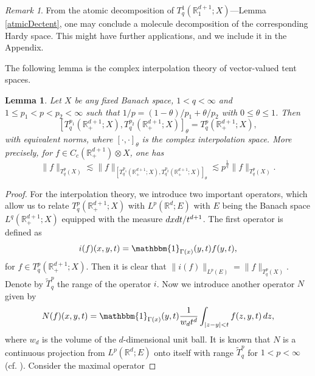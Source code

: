 \documentclass[oneside,english,a4wide]{amsart}
\numberwithin{equation}{section}
\numberwithin{figure}{section}
\theoremstyle{plain}
\theoremstyle{plain}
\theoremstyle{definition}
\theoremstyle{plain}
\newtheorem{lemma}[thm]{Lemma}
\theoremstyle{remark}
\theoremstyle{definition}
\theoremstyle{remark}
\newtheorem{remark}[thm]{Remark}
\theoremstyle{definition}
\newcommand{\real}{{\mathbb R}}
\newcommand{\8}{+\infty}
\renewcommand{\1}{\mathbbm{1}}
\newcommand{\wt}{\widetilde}
\renewcommand\d{{\rm d}}
\begin{document}
{\begin{remark}
From the atomic decomposition of $T^1_q(\mathbb R^{d+1}_1; X)$---Lemma \ref{atmicDectent}, one may conclude a molecule decomposition of the corresponding Hardy space. This might have further applications, and we include it in the Appendix.
\end{remark}

The following lemma is the complex interpolation theory of vector-valued tent spaces.
\begin{lemma}\label{Intpo}
   Let $X$ be any fixed Banach space, $1<q<\infty$ and $1 \leq p_1 < p < p_2 < \infty$ such that $1/p = (1-\theta)/p_1 + \theta/p_2$ with $0\leq\theta\leq1$. Then
   \[
        [T^{p_1}_q(\real^{d+1}_+;X), T^{p_2}_q(\real^{d+1}_+;X)]_\theta = T^p_q(\real^{d+1}_+;X),
   \]
   with equivalent norms, where $[\cdot, \cdot]_\theta$ is the complex interpolation space. More precisely, for $f\in C_c(\real^{d+1}_+)\otimes X$, one has {
   \[
        \|f \|_{T^p_q(X)} \lesssim \| f \|_{[T^{p_1}_q(\real^{d+1}_+;X), T^{p_2}_q(\real^{d+1}_+;X)]_\theta} \lesssim p^{\frac{1}{q}} \| f \|_{T^p_q(X)}.
   \]
   }
\end{lemma}
\begin{proof}
For the interpolation theory, we introduce two important operators, which allow us to relate $T^p_q(\real^{d+1}_+; X)$ with $L^p(\real^d; E)$ with $E$ being the Banach space $L^q(\real^{d+1}_+; X)$ equipped with the measure $\d x\d t/t^{d+1}$.  The first operator is defined as
\[
    i(f)(x, y, t) = \1_{\Gamma(x)} (y, t) f(y, t),
\]
for $f \in T^p_q(\real^{d+1}_+; X)$. Then it is clear that $\| i(f) \|_{ L^p(E) } = \| f \|_{T^p_q(X)}$. Denote by  $\wt{T}_q^p$ the range of the operator $i$. Now we introduce another operator $N$ given by
\[
    N(f)(x, y, t) = \1_{\Gamma(x)}(y, t) \frac{1}{w_dt^d} \int_{ |z - y|< t } f(z, y, t) \,\d z,
\]
where $w_d$ is the volume of the $d$-dimensional unit ball. It is known that $N$ is a continuous projection from $L^p(\real^d; E)$ onto itself with range $\wt{T}_q^p$  for $1 < p < \infty$ (cf. \cite{Harboure1991}).  Consider the maximal operator 

\end{proof}}
\end{document}
